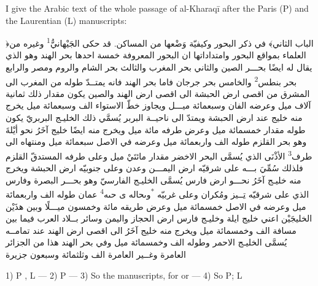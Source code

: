 \documentclass[11pt]{article}
\begin{document}
\par I give the Arabic text of the whole passage of al-Kharaqī after the Paris (P) and the Laurentian (L) manuscripts:\par
\par\begin{Arabic}\ArNote ﴿الباب الثاني﴾ في ذكر البحور وكيفيّة وَضْعها من المساكن. قد حكى الجَيْهانيُّ\textsuperscript{1} وغيره من العلماء بمواقع البحور وامتداداتها ان البحور المعروفة خمسة احدها بحر الهند وهو الذي يقال له ايضًا بحـــر الصين والثاني بحر المغرب والثالث بحر الشام والروم ومصر والرابع بحر بنطس\textsuperscript{2} والخامس بحر جرجان فاما بحر الهند فانه يمتــدّ طوله من المغرب الى المشرق من اقصى ارض الحبشة الى اقصى ارض الهند والصين يكون مقدار ذلك ثمانية آلاف ميل وعرضه الفان وسبعمائة ميـــل ويجاوز خطّ الاستواء الف وسبعمائة ميل يخرج منه خليج عند ارض الحبشة ويمتدّ الى ناحيــة البربر يُسمَّي ذلك الخليـج البربريّ يكون طوله مقدار خمسمائة ميل وعرض طرفه مائة ميل ويخرج منه ايضًا خليج آخَرُ نحو أيْلةَ وهو بحر القلزم طوله الف واربعمائة ميل وعرضه في الاصل سبعمائة ميل ومنتهاه الى طرف\textsuperscript{3} الأذْنَى الذي يُسمَّى البحر الاخضر مقدار مائتَيْ ميل وعلى طرفه المستدقّ القلزم فلذلك سُمِّيَ بـــه على شرقيّه ارض اليمـــن وعدن وعلى جنوبيّه ارض الحبشة ويخرج منه خليـج آخَرُ نحـــو ارض فارس يُسمَّى الخليـج الفارسيّ وهو بحـــر البصرة وفارس الذي على شرقيّه تِــيز ومُكران وعلى غربيّه \textsuperscript{*}وٮحاله ى حٮه\textsuperscript{4} عمان طوله الف واربعمائة ميل وعرضه في الاصل خمسمائة ميل وعرض طريقه مائة وخمسون ميـــلًا وبين هذَيْن الخليجَيْن اعني خليج ايلة وخليـج فارس ارض الحجاز واليمن وسائر بــلاد العرب فيما بين مسافة الف وخمسمائة ميل ويخرج منه خليج آخَرُ الى اقصى ارض الهند عند تمامــه يُسمَّى الخليـج الاحمر وطوله الف وخمسمائة ميل وفي بحر الهند هذا من الجزائر العامرة وغــير العامرة الف وثلثمائة وسبعون جزيرة\end{Arabic}\par
\par 1) P , L  — 2) P  — 3) So the manuscripts, for  or  — 4) So P; L \par
\end{document}
